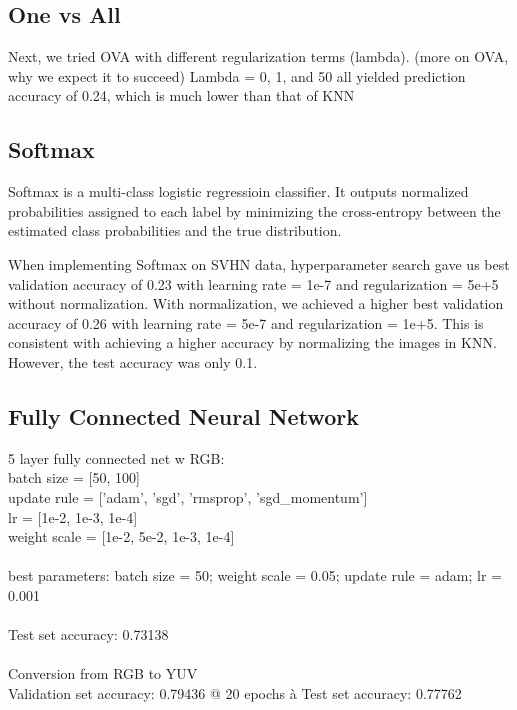 \documentclass[12pt]{article}
\begin{document}
\subsection{One vs All}
\indent \indent Next, we tried OVA with different regularization terms (lambda). (more on OVA, why we expect it to succeed)
Lambda = 0, 1, and 50 all yielded prediction accuracy of 0.24, which is much lower than that of KNN 

\subsection{Softmax}
\indent \indent Softmax is a multi-class logistic regressioin classifier. It outputs normalized probabilities assigned to each label by minimizing the cross-entropy between the estimated class probabilities and the true distribution. 

 \indent When implementing Softmax on SVHN data, hyperparameter search gave us best validation accuracy of 0.23 with learning rate = 1e-7 and regularization = 5e+5 without normalization. With normalization, we achieved a higher best validation accuracy of 0.26 with learning rate = 5e-7 and regularization = 1e+5. This is consistent with achieving a higher accuracy by normalizing the images in KNN. However, the test accuracy was only 0.1.



\subsection{Fully Connected Neural Network}
5 layer fully connected net w RGB:\\
batch size = [50, 100]\\
update rule = ['adam', 'sgd', 'rmsprop', 'sgd\_momentum']\\
lr = [1e-2, 1e-3, 1e-4]\\
weight scale = [1e-2, 5e-2, 1e-3, 1e-4]\\
\\
best parameters: batch size = 50; weight scale = 0.05; update rule = adam; lr = 0.001\\
\\
Test set accuracy: 0.73138\\
\\
Conversion from RGB to YUV\\
Validation set accuracy:  0.79436 @ 20 epochs à Test set accuracy: 0.77762\\
\end{document}
